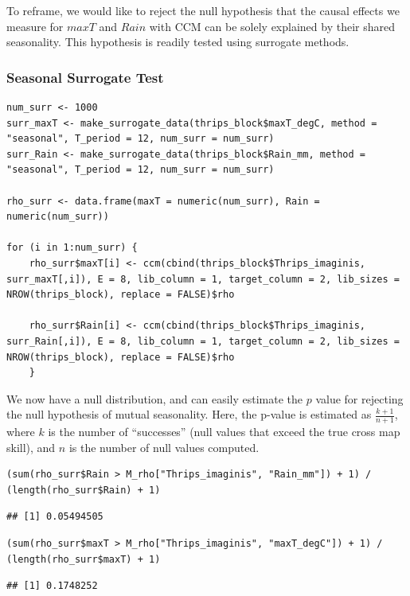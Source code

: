 To reframe, we would like to reject the null hypothesis that the causal effects we measure for $maxT$ and $Rain$ with CCM can be solely explained by their shared seasonality. This hypothesis is readily tested using surrogate methods.

\subsubsection{Seasonal Surrogate Test}

\begin{lstlisting}
num_surr <- 1000
surr_maxT <- make_surrogate_data(thrips_block$maxT_degC, method = "seasonal", T_period = 12, num_surr = num_surr)
surr_Rain <- make_surrogate_data(thrips_block$Rain_mm, method = "seasonal", T_period = 12, num_surr = num_surr)

rho_surr <- data.frame(maxT = numeric(num_surr), Rain = numeric(num_surr))

for (i in 1:num_surr) {
    rho_surr$maxT[i] <- ccm(cbind(thrips_block$Thrips_imaginis, surr_maxT[,i]), E = 8, lib_column = 1, target_column = 2, lib_sizes = NROW(thrips_block), replace = FALSE)$rho
    
    rho_surr$Rain[i] <- ccm(cbind(thrips_block$Thrips_imaginis, surr_Rain[,i]), E = 8, lib_column = 1, target_column = 2, lib_sizes = NROW(thrips_block), replace = FALSE)$rho
    }
\end{lstlisting}

We now have a null distribution, and can easily estimate the $p$ value for rejecting the null hypothesis of mutual seasonality. Here, the p-value is estimated as $\frac{k+1}{n+1}$, where $k$ is the number of ``successes'' (null values that exceed the true cross map skill), and $n$ is the number of null values computed.

\begin{lstlisting}
(sum(rho_surr$Rain > M_rho["Thrips_imaginis", "Rain_mm"]) + 1) / (length(rho_surr$Rain) + 1)
\end{lstlisting}

\begin{lstlisting}[backgroundcolor = \color{white}, commentstyle = \ttfamily]
## [1] 0.05494505
\end{lstlisting}

\begin{lstlisting}
(sum(rho_surr$maxT > M_rho["Thrips_imaginis", "maxT_degC"]) + 1) / (length(rho_surr$maxT) + 1)
\end{lstlisting}

\begin{lstlisting}[backgroundcolor = \color{white}, commentstyle = \ttfamily]
## [1] 0.1748252
\end{lstlisting}


